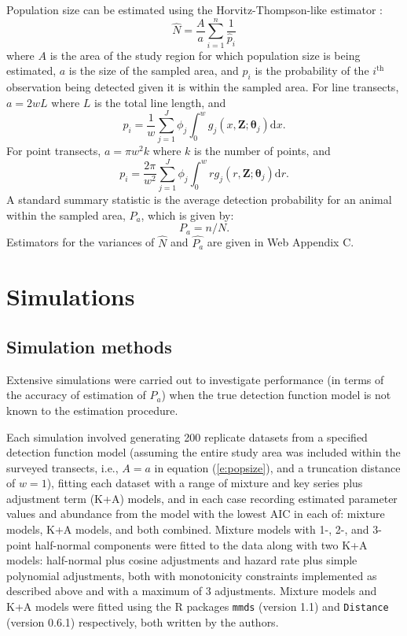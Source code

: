 \documentclass[useAMS,referee,usenatbib]{biom}
\begin{document}
Population size can be estimated using the Horvitz-Thompson-like estimator \citep{Marques:2003vb}:
\begin{equation}
\label{e:popsize}
\hat{N}=\frac{A}{a}\sum_{i=1}^n \frac{1}{\hat {p}_i}
\end{equation}
where $A$ is the area of the study region for which population size is being estimated, $a$ is the size of the sampled area, and $p_i$ is the probability of the $i^\text{th}$ observation being detected given it is within the sampled area.  For line transects, $a=2wL$ where $L$ is the total line length, and 
\begin{equation*}
p_i = \frac{1}{w} \sum_{j=1}^J \phi_j \int_0^w  g_j(x,\mathbf{Z}; \bm{\theta}_j) \text{d}x.
\end{equation*}
For point transects, $a=\pi w^2 k$ where $k$ is the number of points, and 
\begin{equation*}
p_i = \frac{2\pi}{w^2} \sum_{j=1}^J \phi_j \int_0^w  r g_j(r,\mathbf{Z}; \bm{\theta}_j) \text{d}r.
\end{equation*}
A standard summary statistic is the average detection probability for an animal within the sampled area, $P_a$, which is given by:
\begin{equation*}
P_a = n/N.
\end{equation*}
Estimators for the variances of $\hat{N}$ and $\hat{P_a}$ are given in Web Appendix C.

\section{Simulations}
\label{s:sims}

\subsection{Simulation methods}

Extensive simulations were carried out to investigate performance (in terms of the accuracy of estimation of $P_a$) when the true detection function model is not known to the estimation procedure.  

Each simulation involved generating 200 replicate datasets from a specified detection function model (assuming the entire study area was included within the surveyed transects, i.e., $A=a$ in equation (\ref{e:popsize}), and a truncation distance of $w=1$), fitting each dataset with a range of mixture and key series plus adjustment term (K+A) models, and in each case recording estimated parameter values and abundance from the model with the lowest AIC in each of: mixture models, K+A models, and both combined.  Mixture models with 1-, 2-, and 3-point half-normal components were fitted to the data along with two K+A models: half-normal plus cosine adjustments and hazard rate plus simple polynomial adjustments, both with monotonicity constraints implemented as described above and with a maximum of 3 adjustments. Mixture models and K+A models were fitted using the R packages \texttt{mmds} (version 1.1) and \texttt{Distance} (version 0.6.1) respectively, both written by the authors.
\end{document}
